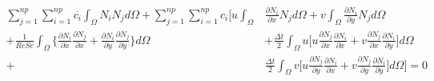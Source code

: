 \begin{equation} \label{concentration pre matrix}
\begin{aligned} 
 \sum\limits_{j=1}^{np}
 \sum\limits_{i=1}^{np} \overset{.}{c_i} \int_{\Omega} N_i N_j d\Omega 
  + \sum\limits_{j=1}^{np}
    \sum\limits_{i=1}^{np} c_i  \Bigg[
    u \int_{\Omega} & \frac{\partial N_i}{\partial x} N_j d\Omega 
  + v \int_{\Omega} \frac{\partial N_i}{\partial y} N_j d\Omega
  \\[5pt]
  + \frac{1}{\textit{ReSc}} \int_{\Omega} \Bigg\{ 
                    \frac{\partial N_i}{\partial x} 
                    \frac{\partial N_j}{\partial x} 
  +                 \frac{\partial N_i}{\partial y} 
                    \frac{\partial N_j}{\partial y} 
  \Bigg\} d\Omega 
 & + \frac{\Delta t}{2} \int_{\Omega} u
 \Bigg[
   u \frac{\partial N_j}{\partial x} \frac{\partial N_i}{\partial x}
 + v \frac{\partial N_j}{\partial x} \frac{\partial N_i}{\partial y}
 \Bigg] d\Omega
 \\[5pt]
  + & \frac{\Delta t}{2} \int_{\Omega} v
 \Bigg[
   u \frac{\partial N_j}{\partial y} \frac{\partial N_i}{\partial x}
 + v \frac{\partial N_j}{\partial y} \frac{\partial N_i}{\partial y}
 \Bigg] d\Omega
 \Bigg] = 0
\end{aligned}
\end{equation}



